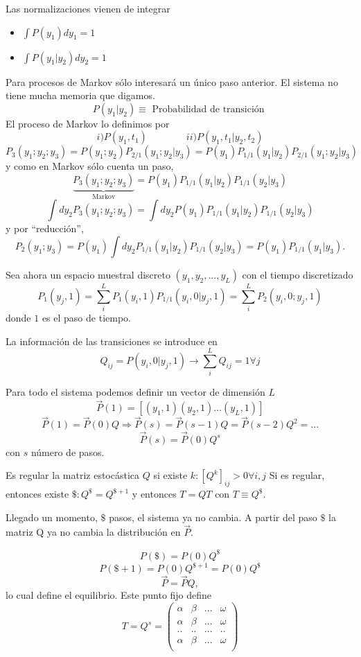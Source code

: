 \documentclass[10pt,oneside]{CBFT_book}
\begin{document}
Las normalizaciones vienen de integrar
\begin{itemize}
 \item $ \int P(y_1) dy_1 = 1 $
 \item $ \int P(y_1|y_2) dy_2 = 1 $
\end{itemize}

Para procesos de Markov sólo interesará un único paso anterior. El sistema no tiene mucha memoria que 
digamos.
\[
	P(y_1|y_2) \equiv \text{ Probabilidad de transición }
\]
El proceso de Markov lo definimos por 
\[
	i) P(y_1,t_1) \qquad \qquad ii) P(y_1,t_1|y_2,t_2)
\]
\[
	P_3(y_1;y_2;y_3) = P(y_1;y_2) P_{2/1}(y_1;y_2|y_3) = P(y_1) P_{1/1}(y_1|y_2) P_{2/1}(y_1;y_2|y_3) 
\]
y como en Markov sólo cuenta un paso,
\[
	\underbrace{P_3(y_1;y_2;y_3)}_{\text{Markov}} = P(y_1) P_{1/1}(y_1|y_2) P_{1/1}(y_2|y_3)
\]
\[
	\int dy_2 P_3(y_1;y_2;y_3) = \int dy_2 P(y_1) P_{1/1}(y_1|y_2) P_{1/1}(y_2|y_3)
\]
y por ``reducción'',
\[
	P_2(y_1;y_3) = P(y_1) \int dy_2 P_{1/1}(y_1|y_2) P_{1/1}(y_2|y_3) = P(y_1) P_{1/1}(y_1|y_3).
\]

Sea ahora un espacio muestral discreto $(y_1,y_2,...,y_L)$ con el tiempo discretizado
\[
	P_1(y_j,1) = \sum_i^L P_1(y_i,1) P_{1/1}(y_i,0|y_j,1) = \sum_i^L P_2(y_i,0 ; y_j,1)
\]
donde $1$ es el paso de tiempo.

La información de las transiciones se introduce en 
\[
	Q_{ij} = P(y_i,0|y_j,1) \rightarrow \sum_i^L Q_{ij} = 1 \forall j 
\]

Para todo el sistema podemos definir un vector de dimensión $L$
\[
	\vec{P}(1) = [ (y_1,1) (y_2,1) ... (y_L,1 )]
\]
\[
	\vec{P}(1) = \vec{P}(0) Q \Rightarrow  \vec{P}(s) = \vec{P}(s-1) Q = \vec{P}(s-2) Q^2 = ...
\]
\[
	\vec{P}(s) = \vec{P}(0) Q^s
\]
con $s$ número de pasos.

Es regular la matriz estocástica $ Q $ si existe $ k : [ Q^k ]_{ij} > 0 \forall i,j $
Si es regular, entonces existe $ \$ : Q^\$ =  Q^{\$+1} $ y entonces $T = QT$ con $T\equiv Q^\$$.

Llegado un momento, $\$$ pasos, el sistema ya no cambia. A partir del paso $\$$ la matriz Q ya no cambia
la distribución en $\vec{P}$.


\[
	P(\$) = P(0) Q^\$
\]
\[
	P(\$+1) = P(0) Q^{\$+1} = P(0) Q^\$
\]
\[
	\vec{P} = \vec{P} Q,
\]
lo cual define el equilibrio. Este punto fijo define
\[
	T = Q^s = \begin{pmatrix}
	         \alpha & \beta & ... & \omega \\
	         \alpha & \beta & ... & \omega \\
	         .. & .. & ... & .. \\
	         \alpha & \beta & ... & \omega \\
	        \end{pmatrix}
\]
\end{document}
